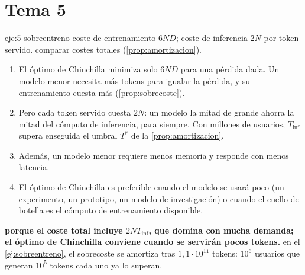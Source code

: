 \section{Tema 5}

\begin{solucion}{eje:5-sobreentreno}
\datos coste de entrenamiento $6ND$; coste de inferencia $2N$ por token servido.
\planteamiento comparar costes totales (\cref{prop:amortizacion}).
\pasos
\begin{enumerate}[label=\arabic*.]
  \item El óptimo de Chinchilla minimiza solo $6ND$ para una pérdida dada. Un modelo menor necesita más tokens para igualar la pérdida, y su entrenamiento cuesta más (\cref{prop:sobrecoste}).
  \item Pero cada token servido cuesta $2N$: un modelo la mitad de grande ahorra la mitad del cómputo de inferencia, para siempre. Con millones de usuarios, $T_{\mathrm{inf}}$ supera enseguida el umbral $T^{*}$ de la \cref{prop:amortizacion}.
  \item Además, un modelo menor requiere menos memoria y responde con menos latencia.
  \item El óptimo de Chinchilla es preferible cuando el modelo se usará poco (un experimento, un prototipo, un modelo de investigación) o cuando el cuello de botella es el cómputo de entrenamiento disponible.
\end{enumerate}
\resultado \textbf{porque el coste total incluye $2N T_{\mathrm{inf}}$, que domina con mucha demanda; el óptimo de Chinchilla conviene cuando se servirán pocos tokens.}
\comprobacion en el \cref{ej:sobreentreno}, el sobrecoste se amortiza tras $1{,}1\cdot 10^{11}$ tokens: $10^{6}$ usuarios que generan $10^{5}$ tokens cada uno ya lo superan.
\end{solucion}

